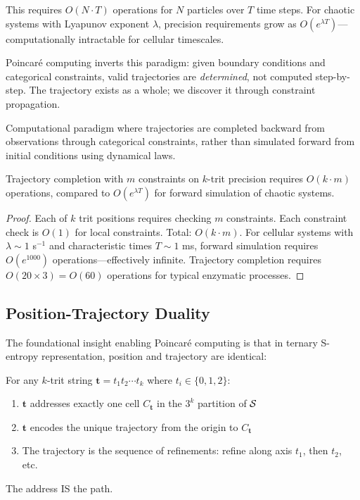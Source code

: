 This requires $O(N \cdot T)$ operations for $N$ particles over $T$ time steps. For chaotic systems with Lyapunov exponent $\lambda$, precision requirements grow as $O(e^{\lambda T})$---computationally intractable for cellular timescales.

Poincar\'{e} computing inverts this paradigm: given boundary conditions and categorical constraints, valid trajectories are \emph{determined}, not computed step-by-step. The trajectory exists as a whole; we discover it through constraint propagation.

\begin{definition}
\label{def:poincare_computing}
Computational paradigm where trajectories are completed backward from observations through categorical constraints, rather than simulated forward from initial conditions using dynamical laws.
\end{definition}

\begin{theorem}
\label{thm:poincare_complexity}
Trajectory completion with $m$ constraints on $k$-trit precision requires $O(k \cdot m)$ operations, compared to $O(e^{\lambda T})$ for forward simulation of chaotic systems.
\end{theorem}

\begin{proof}
Each of $k$ trit positions requires checking $m$ constraints. Each constraint check is $O(1)$ for local constraints. Total: $O(k \cdot m)$. For cellular systems with $\lambda \sim 1$ s$^{-1}$ and characteristic times $T \sim 1$ ms, forward simulation requires $O(e^{1000})$ operations---effectively infinite. Trajectory completion requires $O(20 \times 3) = O(60)$ operations for typical enzymatic processes.
\end{proof}

\subsection{Position-Trajectory Duality}

The foundational insight enabling Poincar\'{e} computing is that in ternary S-entropy representation, position and trajectory are identical:

\begin{theorem}
\label{thm:position_trajectory_duality}
For any $k$-trit string $\mathbf{t} = t_1 t_2 \cdots t_k$ where $t_i \in \{0, 1, 2\}$:
\begin{enumerate}
\item $\mathbf{t}$ addresses exactly one cell $C_{\mathbf{t}}$ in the $3^k$ partition of $\mathcal{S}$
\item $\mathbf{t}$ encodes the unique trajectory from the origin to $C_{\mathbf{t}}$
\item The trajectory is the sequence of refinements: refine along axis $t_1$, then $t_2$, etc.
\end{enumerate}
The address IS the path.
\end{theorem}

